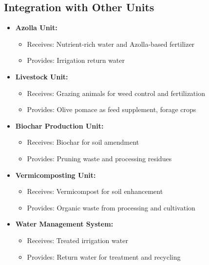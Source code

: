 \subsection{Integration with Other Units}
\begin{itemize}
    \item \textbf{Azolla Unit:}
    \begin{itemize}
        \item Receives: Nutrient-rich water and Azolla-based fertilizer
        \item Provides: Irrigation return water
    \end{itemize}
    
    \item \textbf{Livestock Unit:}
    \begin{itemize}
        \item Receives: Grazing animals for weed control and fertilization
        \item Provides: Olive pomace as feed supplement, forage crops
    \end{itemize}
    
    \item \textbf{Biochar Production Unit:}
    \begin{itemize}
        \item Receives: Biochar for soil amendment
        \item Provides: Pruning waste and processing residues
    \end{itemize}
    
    \item \textbf{Vermicomposting Unit:}
    \begin{itemize}
        \item Receives: Vermicompost for soil enhancement
        \item Provides: Organic waste from processing and cultivation
    \end{itemize}
    
    \item \textbf{Water Management System:}
    \begin{itemize}
        \item Receives: Treated irrigation water
        \item Provides: Return water for treatment and recycling
    \end{itemize}
\end{itemize}

